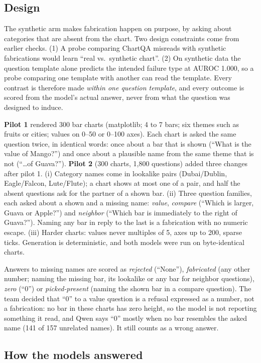 \documentclass[11pt]{article}
\begin{document}
\subsection{Design}
The synthetic arm makes fabrication happen on purpose, by asking about
categories that are absent from the chart. Two design constraints come from
earlier checks. (1) A probe comparing ChartQA misreads with synthetic
fabrications would learn ``real vs.\ synthetic chart''. (2) On synthetic data the
question template alone predicts the intended failure type at AUROC 1.000, so a
probe comparing one template with another can read the template. Every contrast
is therefore made \emph{within one question template}, and every outcome is
scored from the model's actual answer, never from what the question was
designed to induce.

\textbf{Pilot 1} rendered 300 bar charts (matplotlib; 4 to 7 bars; six themes
such as fruits or cities; values on 0--50 or 0--100 axes). Each chart is asked
the same question twice, in identical words: once about a bar that is shown
(``What is the value of Mango?'') and once about a plausible name from the same
theme that is not (``\dots of Guava?''). \textbf{Pilot 2} (300 charts, 1,800
questions) added three changes after pilot 1. (i) Category names come in
lookalike pairs (Dubai/Dublin, Eagle/Falcon, Lute/Flute); a chart shows at most
one of a pair, and half the absent questions ask for the partner of a shown bar.
(ii) Three question families, each asked about a shown and a missing name:
\emph{value}, \emph{compare} (``Which is larger, Guava or Apple?'') and
\emph{neighbor} (``Which bar is immediately to the right of Guava?''). Naming any
bar in reply to the last is a fabrication with no numeric escape. (iii) Harder
charts: values never multiples of 5, axes up to 200, sparse ticks. Generation is
deterministic, and both models were run on byte-identical charts.

Answers to missing names are scored as \emph{rejected} (``None''),
\emph{fabricated} (any other number; naming the missing bar, its lookalike or
any bar for neighbor questions), \emph{zero} (``0'') or
\emph{picked-present} (naming the shown bar in a compare question). The team
decided that ``0'' to a value question is a refusal expressed as a number, not a
fabrication: no bar in these charts has zero height, so the model is not
reporting something it read, and Qwen says ``0'' mostly when no bar resembles
the asked name (141 of 157 unrelated names). It still counts as a wrong answer.

\subsection{How the models answered}
\end{document}
